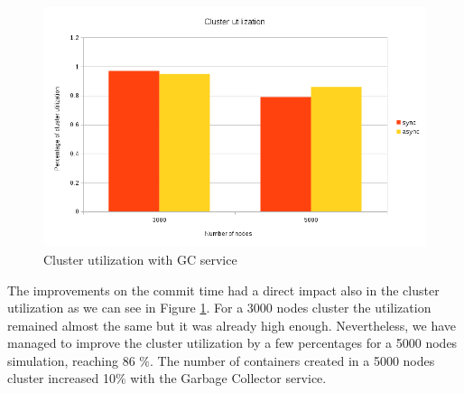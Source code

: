 \begin{figure}
\centering
\includegraphics[scale=0.7]{resources/images/Evaluation/cluster_util_sync_async.png}
\caption{Cluster utilization with GC service}
\label{fig:ev_cluster_util_sync_async}
\end{figure}

The improvements on the commit time had a direct impact also in the
cluster utilization as we can see in Figure
\ref{fig:ev_cluster_util_sync_async}. For a 3000 nodes cluster the
utilization remained almost the same but it was already high
enough. Nevertheless, we have managed to improve the cluster
utilization by a few percentages for a 5000 nodes simulation, reaching
86 $\%$. The number of containers created in a 5000 nodes cluster
increased 10$\%$ with the Garbage Collector service.